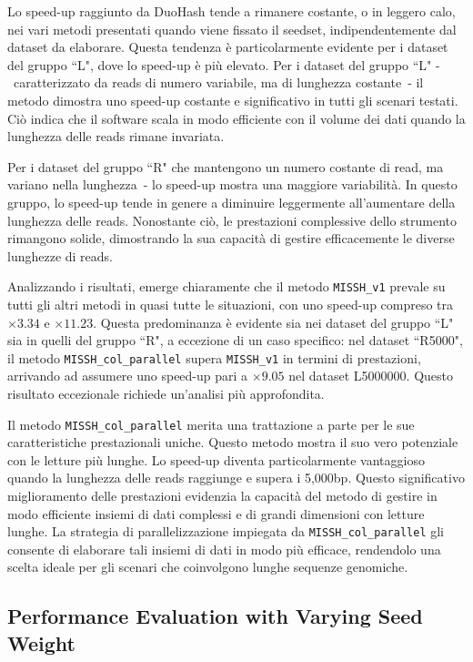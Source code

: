 	Lo speed-up raggiunto da DuoHash tende a rimanere costante, o in leggero calo, nei vari metodi presentati quando viene fissato il seedset, indipendentemente dal dataset da elaborare. Questa tendenza è particolarmente evidente per i dataset del gruppo “L", dove lo speed-up è più elevato. Per i dataset del gruppo “L" -~caratterizzato da reads di numero variabile, ma di lunghezza costante~- il metodo dimostra uno speed-up costante e significativo in tutti gli scenari testati. Ciò indica che il software scala in modo efficiente con il volume dei dati quando la lunghezza delle reads rimane invariata.
	
	Per i dataset del gruppo “R" che mantengono un numero costante di read, ma variano nella lunghezza~- lo speed-up mostra una maggiore variabilità. In questo gruppo, lo speed-up tende in genere a diminuire leggermente all'aumentare della lunghezza delle reads. Nonostante ciò, le prestazioni complessive dello strumento rimangono solide, dimostrando la sua capacità di gestire efficacemente le diverse lunghezze di reads.
	
	Analizzando i risultati, emerge chiaramente che il metodo \verb|MISSH_v1| prevale su tutti gli altri metodi in quasi tutte le situazioni, con uno speed-up compreso tra $\times 3.34$ e $\times 11.23$. Questa predominanza è evidente sia nei dataset del gruppo “L" sia in quelli del gruppo “R", a eccezione di un caso specifico: nel dataset “R5000", il metodo \verb|MISSH_col_parallel| supera \verb|MISSH_v1| in termini di prestazioni, arrivando ad assumere uno speed-up pari a $\times 9.05$ nel dataset L5000000. Questo risultato eccezionale richiede un'analisi più approfondita. 
	
	Il metodo \verb|MISSH_col_parallel| merita una trattazione a parte per le sue caratteristiche prestazionali uniche. Questo metodo mostra il suo vero potenziale con le letture più lunghe. Lo speed-up diventa particolarmente vantaggioso quando la lunghezza delle reads raggiunge e supera i 5,000bp. Questo significativo miglioramento delle prestazioni evidenzia la capacità del metodo di gestire in modo efficiente insiemi di dati complessi e di grandi dimensioni con letture lunghe. La strategia di parallelizzazione impiegata da \verb|MISSH_col_parallel| gli consente di elaborare tali insiemi di dati in modo più efficace, rendendolo una scelta ideale per gli scenari che coinvolgono lunghe sequenze genomiche.
	
	


	\subsection{Performance Evaluation with Varying Seed Weight}
	\label{subsec:performance-varying-seed-weight}
	
